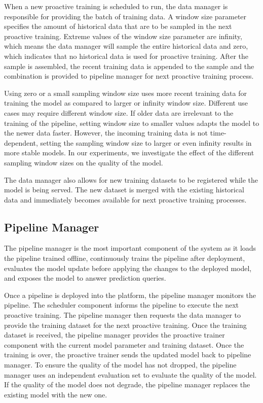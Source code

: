 When a new proactive training is scheduled to run, the data manager is responsible for providing the batch of training data.
A window size parameter specifies the amount of historical data that are to be sampled in the next proactive training.
Extreme values of the window size parameter are infinity, which means the data manager will sample the entire historical data and zero, which indicates that no historical data is used for proactive training.
After the sample is assembled, the recent training data is appended to the sample and the combination is provided to pipeline manager for next proactive training process.

Using zero or a small sampling window size uses more recent training data for training the model as compared to larger or infinity window size.
Different use cases may require different window size.
If older data are irrelevant to the training of the pipeline, setting window size to smaller values adapts the model to the newer data faster.
However, the incoming training data is not time-dependent, setting the sampling window size to larger or even infinity results in more stable models.
In our experiments, we investigate the effect of the different sampling window sizes on the quality of the model.

The data manager also allows for new training datasets to be registered while the model is being served.
The new dataset is merged with the existing historical data and immediately becomes available for next proactive training processes.

\subsection{Pipeline Manager} \label{pipeline-manager} 
The pipeline manager is the most important component of the system as it loads the pipeline trained offline, continuously trains the pipeline after deployment, evaluates the model update before applying the changes to the deployed model, and exposes the model to answer prediction queries.

Once a pipeline is deployed into the platform, the pipeline manager monitors the pipeline.
The scheduler component informs the pipeline to execute the next proactive training.
The pipeline manager then requests the data manager to provide the training dataset for the next proactive training.
Once the training dataset is received, the pipeline manager provides the proactive trainer component with the current model parameter and training dataset.
Once the training is over, the proactive trainer sends the updated model back to pipeline manager.
To ensure the quality of the model has not dropped, the pipeline manager uses an independent evaluation set to evaluate the quality of the model.
If the quality of the model does not degrade, the pipeline manager replaces the existing model with the new one.


